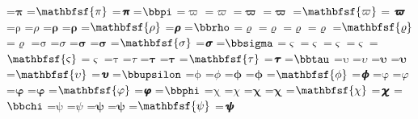 \documentclass{article}
\begin{document}
=\hbox{$\mathbfup{\pi}$}
=\hbox{$\mathbfsf{\pi}$}
=\hbox{$\mathbfsfit{\pi}$}
=\hbox{$\bbpi $}
=\hbox{$\mathrm{\varpi}$}
=\hbox{$\mathit{\varpi}$}
=\hbox{$\mathbf{\varpi}$}
=\hbox{$\mathbfup{\varpi}$}
=\hbox{$\mathbfsf{\varpi}$}
=\hbox{$\mathbfsfit{\varpi}$}
=\hbox{$\mathrm{\rho}$}
=\hbox{$\mathit{\rho}$}
=\hbox{$\mathbf{\rho}$}
=\hbox{$\mathbfup{\rho}$}
=\hbox{$\mathbfsf{\rho}$}
=\hbox{$\mathbfsfit{\rho}$}
=\hbox{$\bbrho $}
=\hbox{$\mathrm{\varrho}$}
=\hbox{$\mathit{\varrho}$}
=\hbox{$\mathbf{\varrho}$}
=\hbox{$\mathbfup{\varrho}$}
=\hbox{$\mathbfsf{\varrho}$}
=\hbox{$\mathbfsfit{\varrho}$}
=\hbox{$\mathrm{\sigma}$}
=\hbox{$\mathit{\sigma}$}
=\hbox{$\mathbf{\sigma}$}
=\hbox{$\mathbfup{\sigma}$}
=\hbox{$\mathbfsf{\sigma}$}
=\hbox{$\mathbfsfit{\sigma}$}
=\hbox{$\bbsigma $}
=\hbox{$\mathrm{\varsigma}$}
=\hbox{$\mathit{\varsigma}$}
=\hbox{$\mathbf{\varsigma}$}
=\hbox{$\mathbfup{\varsigma}$}
=\hbox{$\mathbfsf{\varsigma}$}
=\hbox{$\mathbfsfit{\varsigma}$}
=\hbox{$\mathrm{\tau}$}
=\hbox{$\mathit{\tau}$}
=\hbox{$\mathbf{\tau}$}
=\hbox{$\mathbfup{\tau}$}
=\hbox{$\mathbfsf{\tau}$}
=\hbox{$\mathbfsfit{\tau}$}
=\hbox{$\bbtau $}
=\hbox{$\mathrm{\upsilon}$}
=\hbox{$\mathit{\upsilon}$}
=\hbox{$\mathbf{\upsilon}$}
=\hbox{$\mathbfup{\upsilon}$}
=\hbox{$\mathbfsf{\upsilon}$}
=\hbox{$\mathbfsfit{\upsilon}$}
=\hbox{$\bbupsilon $}
=\hbox{$\mathrm{\phi}$}
=\hbox{$\mathit{\phi}$}
=\hbox{$\mathbf{\phi}$}
=\hbox{$\mathbfup{\phi}$}
=\hbox{$\mathbfsf{\phi}$}
=\hbox{$\mathbfsfit{\phi}$}
=\hbox{$\mathrm{\varphi}$}
=\hbox{$\mathit{\varphi}$}
=\hbox{$\mathbf{\varphi}$}
=\hbox{$\mathbfup{\varphi}$}
=\hbox{$\mathbfsf{\varphi}$}
=\hbox{$\mathbfsfit{\varphi}$}
=\hbox{$\bbphi $}
=\hbox{$\mathrm{\chi}$}
=\hbox{$\mathit{\chi}$}
=\hbox{$\mathbf{\chi}$}
=\hbox{$\mathbfup{\chi}$}
=\hbox{$\mathbfsf{\chi}$}
=\hbox{$\mathbfsfit{\chi}$}
=\hbox{$\bbchi $}
=\hbox{$\mathrm{\psi}$}
=\hbox{$\mathit{\psi}$}
=\hbox{$\mathbf{\psi}$}
=\hbox{$\mathbfup{\psi}$}
=\hbox{$\mathbfsf{\psi}$}
=\hbox{$\mathbfsfit{\psi}$}
\end{document}
